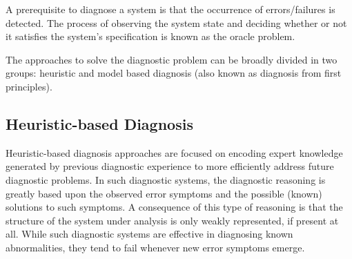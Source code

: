 A prerequisite to diagnose a system is that the occurrence of
errors/failures is detected.
%
The process of observing the system state and deciding whether or not
it satisfies the system's specification is known as the oracle
problem.


The approaches to solve the diagnostic problem can be broadly divided
in two groups: heuristic and model based diagnosis (also known as
diagnosis from first principles).

\subsection{Heuristic-based Diagnosis}
\label{sec:intro:heuristic-diagnosis}
Heuristic-based diagnosis approaches are focused on encoding expert
knowledge generated by previous diagnostic experience to more
efficiently address future diagnostic problems.
%
In such diagnostic systems, the diagnostic reasoning is greatly based
upon the observed error symptoms and the possible (known) solutions to
such symptoms.
%
A consequence of this type of reasoning is that the structure of the
system under analysis is only weakly represented, if present at all.
%
While such diagnostic systems are effective in diagnosing known
abnormalities, they tend to fail whenever new error symptoms emerge.

